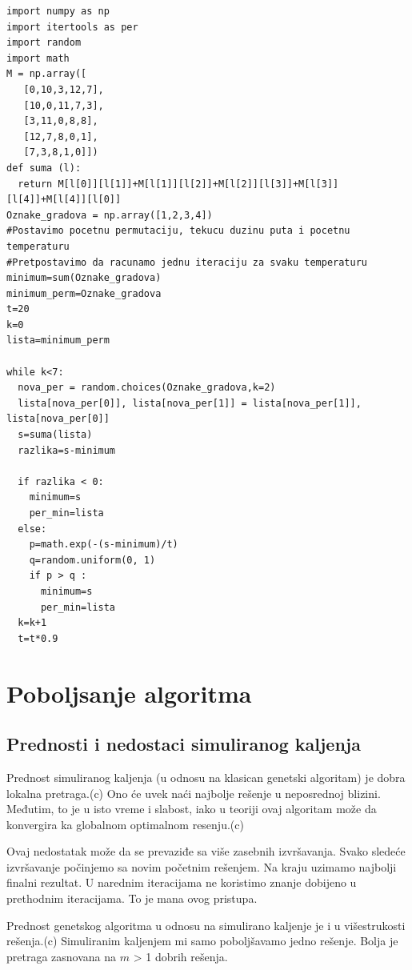 \documentclass[a4paper]{article}
\begin{document}
\begin{lstlisting}[caption={Resavanje problema TSP koriscenjem SA algoritma},frame=single, label=simple]
import numpy as np
import itertools as per
import random
import math 
M = np.array([
   [0,10,3,12,7],
   [10,0,11,7,3],
   [3,11,0,8,8],
   [12,7,8,0,1],
   [7,3,8,1,0]])
def suma (l):
  return M[l[0]][l[1]]+M[l[1]][l[2]]+M[l[2]][l[3]]+M[l[3]][l[4]]+M[l[4]][l[0]]
Oznake_gradova = np.array([1,2,3,4])
#Postavimo pocetnu permutaciju, tekucu duzinu puta i pocetnu temperaturu
#Pretpostavimo da racunamo jednu iteraciju za svaku temperaturu
minimum=sum(Oznake_gradova)
minimum_perm=Oznake_gradova
t=20
k=0
lista=minimum_perm

while k<7:
  nova_per = random.choices(Oznake_gradova,k=2)
  lista[nova_per[0]], lista[nova_per[1]] = lista[nova_per[1]], lista[nova_per[0]]
  s=suma(lista)
  razlika=s-minimum
  
  if razlika < 0:
    minimum=s
    per_min=lista
  else:
    p=math.exp(-(s-minimum)/t)
    q=random.uniform(0, 1)
    if p > q :
      minimum=s
      per_min=lista
  k=k+1
  t=t*0.9
\end{lstlisting}






\section{Poboljsanje algoritma}

\subsection{Prednosti i nedostaci simuliranog kaljenja}
Prednost simuliranog kaljenja (u odnosu na klasican genetski algoritam) je dobra lokalna pretraga.(c) Ono će uvek naći najbolje rešenje u neposrednoj blizini. Međutim, to je u isto vreme i slabost, iako u teoriji ovaj algoritam može da konvergira ka globalnom optimalnom resenju.(c) \par
Ovaj nedostatak može da se prevaziđe sa više zasebnih izvršavanja. Svako sledeće izvršavanje počinjemo sa novim početnim rešenjem. Na kraju uzimamo najbolji finalni rezultat. U narednim iteracijama ne koristimo znanje dobijeno u prethodnim iteracijama. To je mana ovog pristupa. \par
Prednost genetskog algoritma u odnosu na simulirano kaljenje je i u višestrukosti rešenja.(c) Simuliranim kaljenjem mi samo poboljšavamo jedno rešenje. Bolja je pretraga zasnovana na $m$ > 1 dobrih rešenja.
\end{document}
